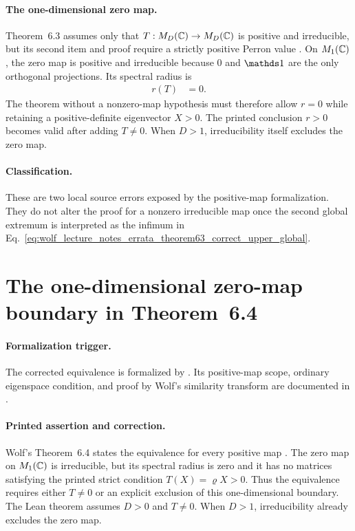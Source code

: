 \documentclass{article}
\begin{document}
\paragraph{The one-dimensional zero map.}
Theorem~6.3 assumes only that $T:M_{D}(\mathbb{C})\to M_{D}(\mathbb{C})$ is positive and irreducible,
but its second item and proof require a strictly positive Perron value
\cite[Theorem~6.3]{Wolf2012Quantum}. On $M_{1}(\mathbb{C})$, the zero map is positive and
irreducible because $0$ and $\Id$ are the only orthogonal projections. Its
spectral radius is
\begin{align}
    r(T)
        &=0.
    \label{eq:wolf_lecture_notes_errata_theorem63_zero_map_radius}
\end{align}
The theorem without a nonzero-map hypothesis must therefore allow $r=0$ while
retaining a positive-definite eigenvector $X>0$. The printed conclusion $r>0$
becomes valid after adding $T\neq0$. When $D>1$, irreducibility itself excludes
the zero map.

\paragraph{Classification.}
These are two local source errors exposed by the positive-map formalization.
They do not alter the proof for a nonzero irreducible map once the second
global extremum is interpreted as the infimum in
Eq.~\ref{eq:wolf_lecture_notes_errata_theorem63_correct_upper_global}.

\section{The one-dimensional zero-map boundary in Theorem~6.4}
\label{sec:theorem-6-4}

\paragraph{Formalization trigger.}
The corrected equivalence is formalized by .  Its
positive-map scope, ordinary eigenspace condition, and proof by Wolf's
similarity transform are documented in
.

\paragraph{Printed assertion and correction.}
Wolf's Theorem~6.4 states the equivalence for every positive map
\cite[Theorem~6.4]{Wolf2012Quantum}.  The zero map on $M_{1}(\mathbb{C})$ is irreducible,
but its spectral radius is zero and it has no matrices satisfying the printed
strict condition $T(X)=\varrho X>0$.  Thus the equivalence requires either
$T\neq0$ or an explicit exclusion of this one-dimensional boundary.  The Lean
theorem assumes $D>0$ and $T\neq0$.  When $D>1$, irreducibility already excludes
the zero map.
\end{document}

